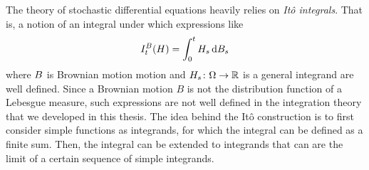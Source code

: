 The theory of stochastic differential equations heavily relies on \emph{Itô integrals}.
That is, a notion of an integral under which expressions like
\begin{equation}
	I_t^B(H) = \int_{\num{0}}^t H_s\,\mathrm{d}B_s
\end{equation}
where \( B \) is Brownian motion motion and \( H_s \colon \Omega \to \mathbb{R} \) is a general integrand are well defined.
Since a Brownian motion \( B \) is not the distribution function of a Lebesgue measure, such expressions are not well defined in the integration theory that we developed in this thesis.
The idea behind the Itô construction is to first consider simple functions as integrands, for which the integral can be defined as a finite sum.
Then, the integral can be extended to integrands that can are the limit of a certain sequence of simple integrands.

